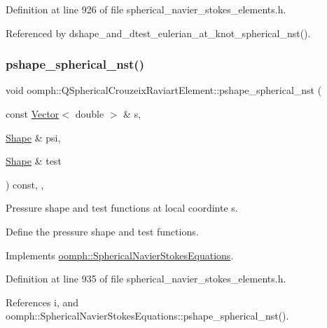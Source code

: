 Definition at line 926 of file spherical\+\_\+navier\+\_\+stokes\+\_\+elements.\+h.



Referenced by dshape\+\_\+and\+\_\+dtest\+\_\+eulerian\+\_\+at\+\_\+knot\+\_\+spherical\+\_\+nst().

\mbox{\label{classoomph_1_1QSphericalCrouzeixRaviartElement_a25604ebbfd2720a969f2c3b6670d0d9c}} 
\subsubsection{\texorpdfstring{pshape\+\_\+spherical\+\_\+nst()}{pshape\_spherical\_nst()}\hspace{0.1cm}{\footnotesize\ttfamily [2/2]}}
{\footnotesize\ttfamily void oomph\+::\+Q\+Spherical\+Crouzeix\+Raviart\+Element\+::pshape\+\_\+spherical\+\_\+nst (\begin{DoxyParamCaption}\item[{const \hyperlink{classoomph_1_1Vector}{Vector}$<$ double $>$ \&}]{s,  }\item[{\hyperlink{classoomph_1_1Shape}{Shape} \&}]{psi,  }\item[{\hyperlink{classoomph_1_1Shape}{Shape} \&}]{test }\end{DoxyParamCaption}) const\hspace{0.3cm}{\ttfamily [inline]}, {\ttfamily [protected]}, {\ttfamily [virtual]}}



Pressure shape and test functions at local coordinte s. 

Define the pressure shape and test functions. 

Implements \hyperlink{classoomph_1_1SphericalNavierStokesEquations_a862f1da9ef70c289f4220391443b7d09}{oomph\+::\+Spherical\+Navier\+Stokes\+Equations}.



Definition at line 935 of file spherical\+\_\+navier\+\_\+stokes\+\_\+elements.\+h.



References i, and oomph\+::\+Spherical\+Navier\+Stokes\+Equations\+::pshape\+\_\+spherical\+\_\+nst().

